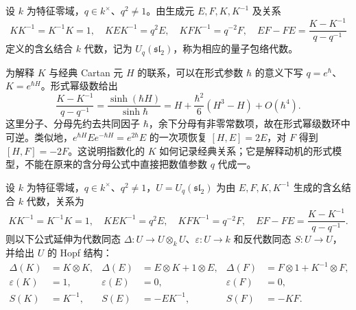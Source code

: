 \begin{definition}\label{b5:def:B-quantum-sl2}
	设 \(k\) 为特征零域，\(q\in k^\times\)、\(q^2\ne1\)。由生成元 \(E,F,K,K^{-1}\) 及关系
	\[
		KK^{-1}=K^{-1}K=1,\quad KEK^{-1}=q^2E,\quad KFK^{-1}=q^{-2}F,\quad EF-FE=\frac{K-K^{-1}}{q-q^{-1}}
	\]
	定义的含幺结合 \(k\) 代数，记为 \(U_q(\mathfrak{sl}_2)\)，称为相应的量子包络代数。
\end{definition}
为解释 \(K\) 与经典 Cartan 元 \(H\) 的联系，可以在形式参数 \(\hbar\) 的意义下写 \(q=e^\hbar\)、\(K=e^{\hbar H}\)。形式幂级数给出
\[
	\frac{K-K^{-1}}{q-q^{-1}} =\frac{\sinh(\hbar H)}{\sinh\hbar} =H+\frac{\hbar^2}{6}(H^3-H)+O(\hbar^4).
\]
这里分子、分母先约去共同因子 \(\hbar\)，余下分母有非零常数项，故在形式幂级数环中可逆。类似地，\(e^{\hbar H}Ee^{-\hbar H}=e^{2\hbar}E\) 的一次项恢复 \([H,E]=2E\)，对 \(F\) 得到 \([H,F]=-2F\)。这说明指数化的 \(K\) 如何记录经典关系；它是解释动机的形式模型，不能在原来的含分母公式中直接把数值参数 \(q\) 代成一。
\begin{proposition}\label{b5:prop:B-quantum-hopf}
	设 \(k\) 为特征零域，\(q\in k^\times\)、\(q^2\ne1\)，\(U=U_q(\mathfrak{sl}_2)\) 为由 \(E,F,K,K^{-1}\) 生成的含幺结合 \(k\) 代数，关系为
	\[
		KK^{-1}=K^{-1}K=1,\quad KEK^{-1}=q^2E,\quad KFK^{-1}=q^{-2}F,\quad EF-FE=\frac{K-K^{-1}}{q-q^{-1}}.
	\]
	则以下公式延伸为代数同态 \(\Delta:U\to U\otimes_kU\)、\(\varepsilon:U\to k\) 和反代数同态 \(S:U\to U\)，并给出 \(U\) 的 Hopf 结构：
	\[
		\begin{aligned}
			\Delta(K)&=K\otimes K,& \Delta(E)&=E\otimes K+1\otimes E,& \Delta(F)&=F\otimes1+K^{-1}\otimes F,\\
			\varepsilon(K)&=1,&\varepsilon(E)&=0,&\varepsilon(F)&=0,\\
			S(K)&=K^{-1},&S(E)&=-EK^{-1},&S(F)&=-KF.
		\end{aligned}
	\]
\end{proposition}
